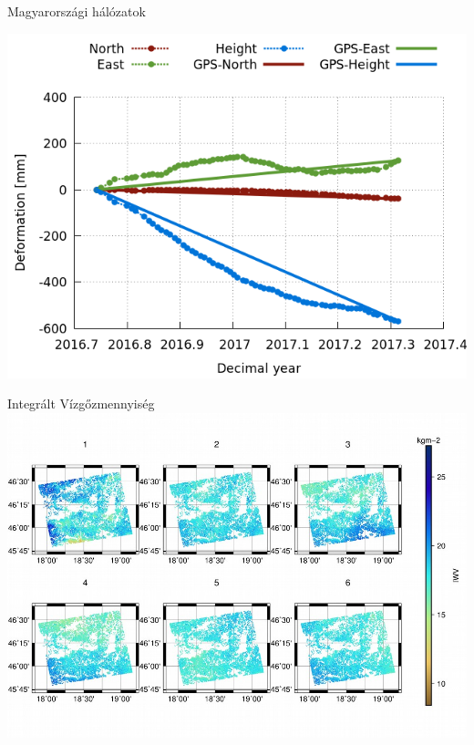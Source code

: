 \documentclass{beamer}
\begin{document}
\begin{frame}{Magyarországi hálózatok}
\begin{minipage}[c]{0.975\textwidth}
\begin{minipage}[c]{0.475\textwidth}
        \includegraphics[width=\textwidth]{IB4-IB1_kalman.png}
    \end{minipage}
    \begin{minipage}[c]{0.475\textwidth}
        
    \end{minipage}
\end{minipage}
\end{frame}

\begin{frame}{}

\end{frame}


\begin{frame}{Integrált Vízgőzmennyiség}
\includegraphics[width=\textwidth]{iwv.png}
\end{frame}
\end{document}
